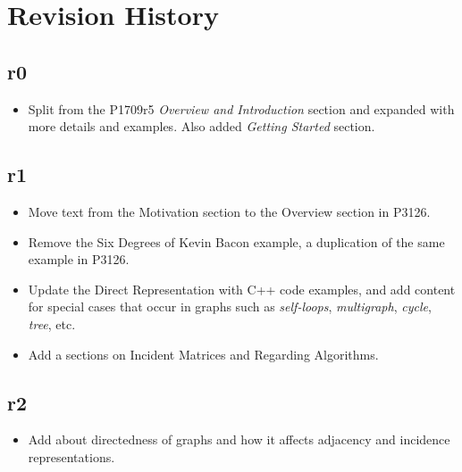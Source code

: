 \section{Revision History}

\subsection*{\paperno r0}

\begin{itemize}
      \item Split from the P1709r5 \textit{Overview and Introduction} section and expanded with 
            more details and examples. Also added \textit{Getting Started} section.
\end{itemize}

\subsection*{\paperno r1}

\begin{itemize}
      \item Move text from the Motivation section to the Overview section in P3126.
      \item Remove the Six Degrees of Kevin Bacon example, a duplication of the same example in P3126.
      \item Update the Direct Representation with C++ code examples, and add content for special cases that 
            occur in graphs such as \emph{self-loops}, \emph{multigraph}, \emph{cycle}, \emph{tree}, etc.
      \item Add a sections on Incident Matrices and Regarding Algorithms.
\end{itemize}

\subsection*{\paperno r2}
\begin{itemize}
      \item Add about directedness of graphs and how it affects adjacency and incidence representations.
\end{itemize}
